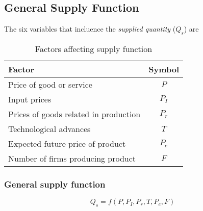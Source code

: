 \documentclass[oneside]{book}
\begin{document}
\subsection{General Supply Function}
The six variables that incluence the \textit{supplied quantity} ($Q_s$) are
\begin{table}[ht]
	\centering
	\begin{tabular}{|lc|}
		\hline
		\textbf{Factor}                       & \textbf{Symbol} \\
		\hline
		Price of good or service              & \(P\)           \\
		Input prices                          & \(P_I\)         \\
		Prices of goods related in production & \(P_r\)         \\
		Technological advances                & \(T\)           \\
		Expected future price of product      & \(P_e\)         \\
		Number of firms producing product     & \(F\)           \\
		\hline
	\end{tabular}
	\caption{Factors affecting supply function}
\end{table}
\subsubsection{General supply function}
\[
	Q_s = f(P, P_I, P_r, T, P_e ,F)
\]
\end{document}
